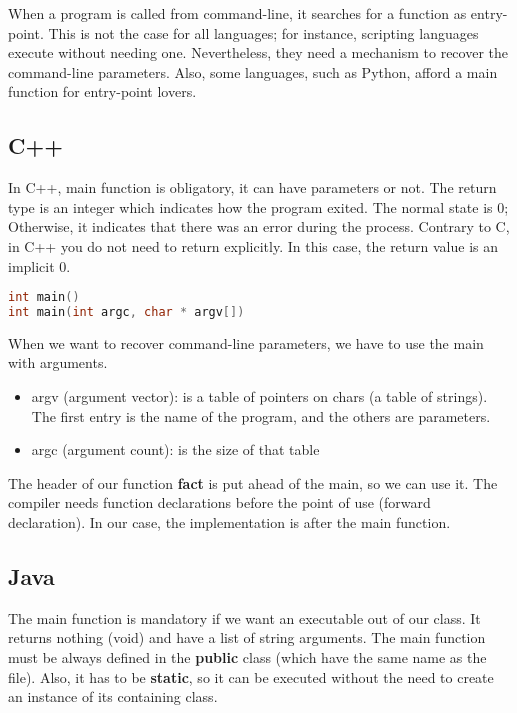 \documentclass{KodeBook}
\begin{document}
When a program is called from command-line, it searches for a function as entry-point. 
This is not the case for all languages; for instance, scripting languages execute without needing one. 
Nevertheless, they need a mechanism to recover the command-line parameters. 
Also, some languages, such as Python, afford a main function for entry-point lovers.

\subsection{C++}

In C++, main function is obligatory,  it can have parameters or not. 
The return type is an integer which indicates how the program exited. 
The normal state is 0; Otherwise, it indicates that there was an error during the process.
Contrary to C, in C++ you do not need to return explicitly.
In this case, the return value is an implicit 0.
\begin{lstlisting}[language=C++, style=codeStyle]
int main()
int main(int argc, char * argv[])
\end{lstlisting}

When we want to recover command-line parameters, we have to use the main with arguments. 
\begin{itemize}
	\item argv (argument vector): is a table of pointers on chars (a table of strings).
	The first entry is the name of the program, and the others are parameters. 
	\item argc (argument count): is the size of that table
\end{itemize}



The header of our function \textbf{fact} is put ahead of the main, so we can use it. 
The compiler needs function declarations before the point of use (forward declaration). 
In our case, the implementation is after the main function.

\subsection{Java}

The main function is mandatory if we want an executable out of our class. 
It returns nothing (void) and have a list of string arguments. 
The main function must be always defined in the \textbf{public} class (which have the same name as the file). 
Also, it has to be \textbf{static}, so it can be executed without the need to create an instance of its containing class.
\end{document}

